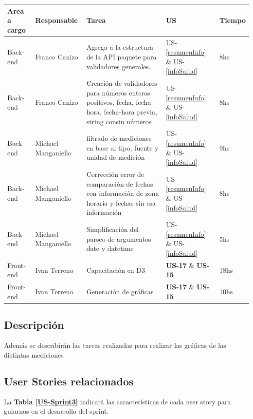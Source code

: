 \documentclass[a4paper,12pt]{article}
\begin{document}
	{\scriptsize
	\begin{center} %
	\centering
    \resizebox{\textwidth}{!}
    {
	\begin{tabular}{|l|l|p{5cm}|l|l|}
	    \hline
	        \textbf{Area a cargo} &
	        \textbf{Responsable} &        
	        \textbf{Tarea} &
	        \textbf{US} &
            \textbf{Tiempo}\\
   		\hline
       
	    Back-end& Franco Canizo & Agrega a la estructura de la API paquete para validadores generales.  & US-\ref{resumenInfo} \& US-\ref{infoSalud} & 8hs\\ \hline
	    Back-end& Franco Canizo & Creación de validadores para números enteros positivos, fecha, fecha-hora, fecha-hora previa, string con\/sin números  & US-\ref{resumenInfo} \& US-\ref{infoSalud} &8hs\\ \hline
	    Back-end& Michael Manganiello & filtrado de mediciones en base al tipo, fuente y unidad de medición & US-\ref{resumenInfo} \& US-\ref{infoSalud}&9hs \\ \hline
	    Back-end& Michael Manganiello & Corrección error de comparación de fechas con información de zona horaria y fechas sin esa información & US-\ref{resumenInfo} \& US-\ref{infoSalud} &8hs\\ \hline
	    Back-end& Michael Manganiello & Simplificación del parseo de argumentos date y datetime & US-\ref{resumenInfo} \& US-\ref{infoSalud} &5hs \\ \hline        
   	    Front-end& Ivan Terreno & Capacitación en D3 & \textbf{US-17} \& \textbf{US-15}&18hs\\ \hline
   	    Front-end& Ivan Terreno & Generación de gráficas & \textbf{US-17} \& \textbf{US-15}&10hs\\ \hline        
	    \end{tabular}
        }
    	\end{center}
	}


\subsection{Descripción}

Además se describirán las tareas realizadas para realizar las gráficas de las distintas mediciones

\subsection{User Stories relacionados}
La \textbf{Tabla \ref{US-Sprint3} } indicará las características de cada user story para guiarnos en el desarrollo del sprint.
\end{document}
